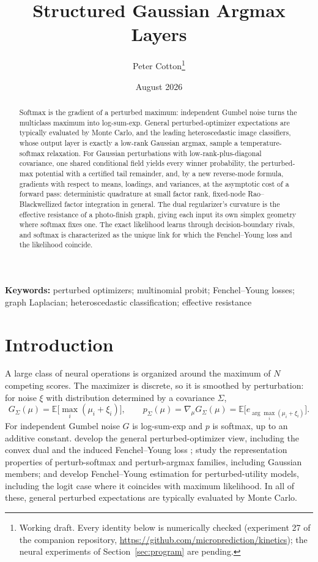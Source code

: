 \documentclass[11pt]{article}
\title{Structured Gaussian Argmax Layers}
\author{Peter Cotton\thanks{Working draft. Every identity below is
numerically checked (experiment 27 of the companion repository,
\url{https://github.com/microprediction/kinetics}); the neural
experiments of Section~\ref{sec:program} are pending.}}
\date{August 2026}
\theoremstyle{remark}
\newcommand{\E}{\mathbb{E}}
\begin{document}
\maketitle

\begin{abstract}
Softmax is the gradient of a perturbed maximum: independent Gumbel noise
turns the multiclass maximum into log-sum-exp. General perturbed-optimizer
expectations are typically evaluated by Monte Carlo, and the leading
heteroscedastic image classifiers, whose output layer is exactly a
low-rank Gaussian argmax, sample a temperature-softmax relaxation. For
Gaussian perturbations with low-rank-plus-diagonal covariance, one
shared conditional field yields every winner probability, the
perturbed-max potential with a certified tail remainder, and, by a new
reverse-mode formula, gradients with respect to means, loadings, and
variances, at the asymptotic cost of a forward pass: deterministic
quadrature at small factor rank, fixed-node Rao--Blackwellized factor
integration in general. The dual regularizer's curvature is the
effective resistance of a photo-finish graph, giving each input its own
simplex geometry where softmax fixes one. The exact likelihood learns
through decision-boundary rivals, and softmax is characterized as the
unique link for which the Fenchel--Young loss and the likelihood
coincide.
\end{abstract}

\noindent\textbf{Keywords:} perturbed optimizers; multinomial probit;
Fenchel--Young losses; graph Laplacian; heteroscedastic classification;
effective resistance

\section{Introduction}

A large class of neural operations is organized around the maximum of
$N$ competing scores. The maximizer is discrete, so it is smoothed by
perturbation: for noise $\xi$ with distribution determined by a
covariance $\Sigma$,
\[
G_\Sigma(\mu) = \E\Big[\max_i (\mu_i + \xi_i)\Big], \qquad
p_\Sigma(\mu) = \nabla_\mu G_\Sigma(\mu)
= \E\big[e_{\arg\max_i(\mu_i + \xi_i)}\big].
\]
For independent Gumbel noise $G$ is log-sum-exp and $p$ is softmax, up
to an additive constant. \citet{berthet2020} develop the general
perturbed-optimizer view, including the convex dual and the induced
Fenchel--Young loss \citep{blondel2020}; \citet{indelman2024} study the
representation properties of perturb-softmax and perturb-argmax
families, including Gaussian members; and \citet{lin2026} develop
Fenchel--Young estimation for perturbed-utility models, including the
logit case where it coincides with maximum likelihood. In all of these,
general perturbed expectations are typically evaluated by Monte Carlo.
\end{document}

